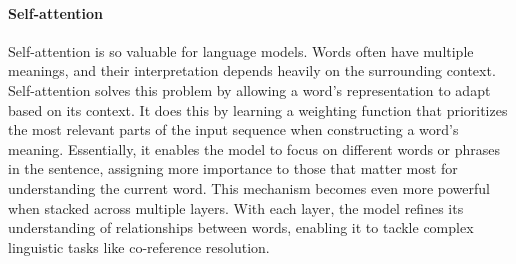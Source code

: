 \paragraph*{Self-attention}
Self-attention is so valuable for language models. 
Words often have multiple meanings, and their interpretation depends heavily on the surrounding context.
Self-attention solves this problem by allowing a word's representation to adapt based on its context. 
It does this by learning a weighting function that prioritizes the most relevant parts of the input sequence when constructing a word's meaning. 
Essentially, it enables the model to focus on different words or phrases in the sentence, assigning more importance to those that matter most for understanding the current word.
This mechanism becomes even more powerful when stacked across multiple layers. 
With each layer, the model refines its understanding of relationships between words, enabling it to tackle complex linguistic tasks like co-reference resolution.

